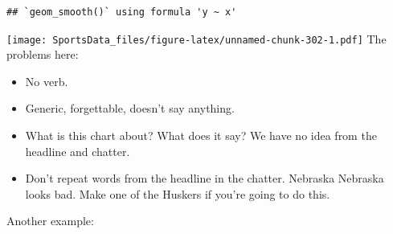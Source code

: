 \documentclass[
]{book}
\providecommand{\tightlist}{%
  \setlength{\itemsep}{0pt}\setlength{\parskip}{0pt}}
\begin{document}
\begin{verbatim}
## `geom_smooth()` using formula 'y ~ x'
\end{verbatim}

\texttt{[image: SportsData\_files/figure-latex/unnamed-chunk-302-1.pdf]}
The problems here:

\begin{itemize}
\tightlist
\item
  No verb.
\item
  Generic, forgettable, doesn't say anything.
\item
  What is this chart about? What does it say? We have no idea from the headline and chatter.
\item
  Don't repeat words from the headline in the chatter. Nebraska Nebraska looks bad. Make one of the Huskers if you're going to do this.
\end{itemize}

Another example:
\end{document}
